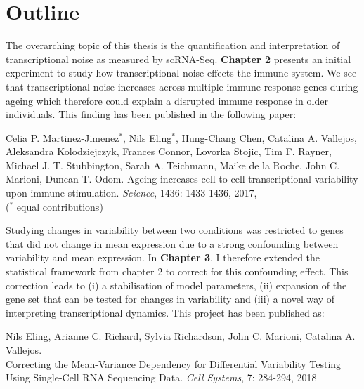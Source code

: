 

\section{Outline}

The overarching topic of this thesis is the quantification and interpretation of transcriptional noise as measured by scRNA-Seq. 
\textbf{Chapter 2} presents an initial experiment to study how  transcriptional noise effects the immune system. 
We see that transcriptional noise increases across multiple immune response genes during ageing which therefore could explain a disrupted immune response in older individuals. 
This finding has been published in the following paper:

\begin{Abstract}
\hspace{-5mm} Celia P. Martinez-Jimenez$^\ast$, Nils  Eling$^\ast$, Hung-Chang Chen, Catalina A. Vallejos, Aleksandra Kolodziejczyk, Frances Connor, Lovorka Stojic, Tim F. Rayner, Michael J. T. Stubbington, Sarah A. Teichmann, Maike de la Roche, John C. Marioni, Duncan T. Odom. 
Ageing increases cell-to-cell transcriptional variability upon immune stimulation. \emph{Science}, 1436: 1433-1436, 2017, \\
($^\ast$ equal contributions) 
\end{Abstract}

Studying changes in variability between two conditions was restricted to genes that did not change in mean expression due to a strong confounding between variability and mean expression. 
In \textbf{Chapter 3}, I therefore extended the statistical framework from chapter 2 to correct for this confounding effect. 
This correction leads to (i) a stabilisation of model parameters, (ii) expansion of the gene set that can be tested for changes in variability and (iii) a novel way of interpreting transcriptional dynamics. 
This project has been published as:

\begin{Abstract}
\hspace{-5mm} Nils Eling, Arianne C. Richard, Sylvia Richardson, John C. Marioni, Catalina A. Vallejos. \\
Correcting the Mean-Variance Dependency for Differential Variability Testing Using Single-Cell RNA Sequencing Data. \emph{Cell Systems}, 7: 284-294, 2018
\end{Abstract}

